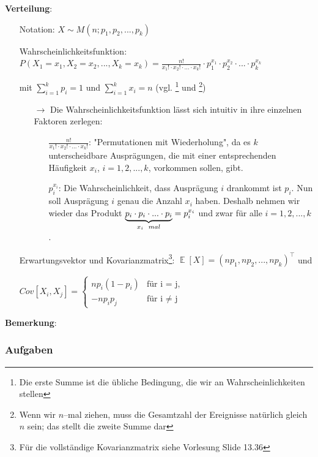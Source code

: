 \documentclass[a4paper]{article}
\DeclareMathOperator*{\E}{\mathbb{E}}
\begin{document}
\noindent \textbf{Verteilung}:
\begin{itemize}
\item[] Notation: $X \sim M(n;p_1,p_2,...,p_k)$
\item[] Wahrscheinlichkeitsfunktion: $P(X_1=x_1,X_2=x_2,...,X_k=x_k)=\frac{n!}{x_1! \cdot x_2! \cdot ... \cdot x_k!} \cdot p_1^{x_1} \cdot p_2^{x_2} \cdot ... \cdot p_k^{x_k}$
\item[] \hspace{4.5cm} mit $\sum_{i=1}^kp_i=1$ und $\sum_{i=1}^kx_i=n$ (vgl. \footnote{Die erste Summe ist die übliche Bedingung, die wir an Wahrscheinlichkeiten stellen} und \footnote{Wenn wir $n$--mal ziehen, muss die Gesamtzahl der Ereignisse natürlich gleich $n$ sein; das stellt die zweite Summe dar})
	\begin{itemize}
	\item[$\rightarrow$] Die Wahrscheinlichkeitsfunktion lässt sich intuitiv in ihre einzelnen Faktoren zerlegen:
		\begin{itemize}
		\item[] $\frac{n!}{x_1! \cdot x_2! \cdot ... \cdot x_k!}$:  "Permutationen mit Wiederholung", da es $k$ unterscheidbare Ausprägungen, die mit einer entsprechenden Häufigkeit $x_i$, $i=1,2,...,k$, vorkommen sollen, gibt.  
		\item[] $p_i^{x_i}$: Die Wahrscheinlichkeit, dass Ausprägung $i$ drankommt ist $p_i$. Nun soll Ausprägung $i$ genau die Anzahl $x_i$ haben. Deshalb nehmen wir wieder das Produkt  $\underbrace{p_i\cdot p_i \cdot ... \cdot p_i}_{x_i \hspace{0.2cm} mal} = p_i^{x_i}$ und zwar für alle $i=1,2,...,k$.
		\end{itemize}
	\end{itemize}
\item[] Erwartungsvektor und Kovarianzmatrix\footnote{Für die vollständige Kovarianzmatrix siehe Vorlesung Slide 13.36}: $\E[X]=(np_1,np_2,...,np_k)^{\top}$ und
\item[] \hspace{6.5cm} $Cov[X_i,X_j]=\begin{cases}
			np_i(1-p_i) & \text{für i = j,}\\
            -np_ip_j & \text{für i $\neq$ j}
		 \end{cases}$ 

\end{itemize}

\noindent \textbf{Bemerkung}: 


\clearpage
\subsubsection{Aufgaben}
\end{document}
